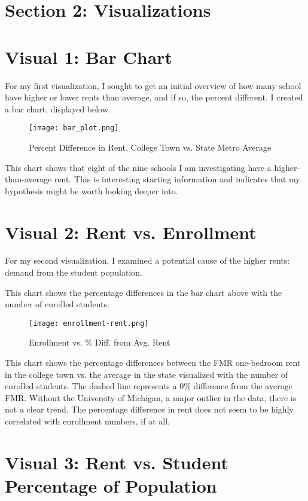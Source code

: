 \documentclass[12pt]{article}
\begin{document}
\section*{Section 2: Visualizations}

\section*{\small{Visual 1: Bar Chart}}
For my first visualization, I sought to get an initial overview of how many school have higher or lower rents than average, and if so, the percent different. I created a bar chart, displayed below. 

\begin{figure}[H]
    \centering
    \texttt{[image: bar\_plot.png]}
    \caption{Percent Difference in Rent, College Town vs. State Metro Average}
    \label{fig:enter-label}
\end{figure}

This chart shows that eight of the nine schools I am investigating have a higher-than-average rent. This is interesting starting information and indicates that my hypothesis might be worth looking deeper into. 

\section*{\small{Visual 2: Rent vs. Enrollment}}
For my second visualization, I examined a potential cause of the higher rents: demand from the student population. 

This chart shows the percentage differences in the bar chart above with the number of enrolled students.

\begin{figure}[H]
    \centering
    \texttt{[image: enrollment-rent.png]}
    \caption{Enrollment vs. \% Diff. from Avg. Rent}
    \label{fig:enter-label}
\end{figure}

This chart shows the percentage differences between the FMR one-bedroom rent in the college town vs. the average in the state visualized with the number of enrolled students. The dashed line represents a 0\% difference from the average FMR. Without the University of Michigan, a major outlier in the data, there is not a clear trend. The percentage difference in rent does not seem to be highly correlated with enrollment numbers, if at all. 

\section*{\small{Visual 3: Rent vs. Student Percentage of Population}}
\end{document}
